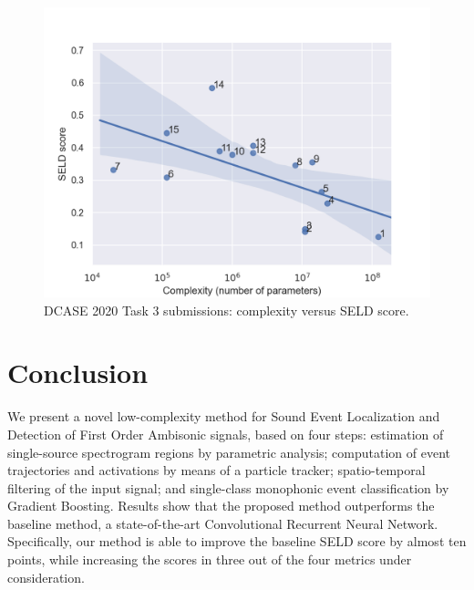 \begin{figure}[t]
  \centering
  \centerline{\includegraphics[width=0.8\columnwidth]{Figures/SELD/seld_complexity_v4.png}}
  \caption{DCASE 2020 Task 3 submissions: complexity versus SELD score.}
  \label{fig:importance}
\end{figure}



\section{Conclusion}
\label{sec:results}


We present a novel low-complexity method for Sound Event Localization and Detection of First Order Ambisonic signals, based on four steps: estimation of single-source spectrogram regions by parametric analysis; computation of event trajectories and activations by means of a particle tracker; spatio-temporal filtering of the input signal; and single-class monophonic event classification by Gradient Boosting. 
Results show that the proposed method outperforms the baseline method, a state-of-the-art Convolutional Recurrent Neural Network. Specifically, our method is able to improve the baseline SELD score by almost ten points, while increasing the scores in three out of the four metrics under consideration.

